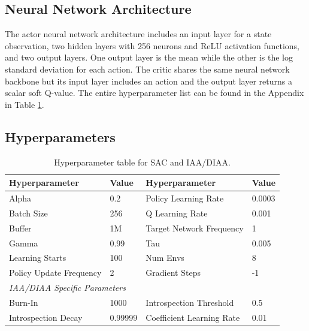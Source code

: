 \documentclass{article} %
\begin{document}
\subsection{Neural Network Architecture}
\label{appx:nn}

The actor neural network architecture includes an input layer for a state observation, two hidden layers with 256 neurons and ReLU activation functions, and two output layers. One output layer is the mean while the other is the log standard deviation for each action. The critic shares the same neural network backbone but its input layer includes an action and the output layer returns a scalar soft Q-value. The entire hyperparameter list can be found in the Appendix in Table \ref{tbl:hyperparams}.


\subsection{Hyperparameters}

\begin{table}[h]
\centering
\begin{tabular}{|l|l||l|l|}
\hline
\textbf{Hyperparameter} & \textbf{Value} & \textbf{Hyperparameter} & \textbf{Value} \\ \hline
Alpha                      & 0.2      & Policy Learning Rate      & 0.0003 \\
Batch Size                 & 256      & Q Learning Rate           & 0.001  \\
Buffer                     & 1M       & Target Network Frequency  & 1      \\
Gamma                      & 0.99     & Tau                       & 0.005  \\
Learning Starts            & 100      & Num Envs                  & 8      \\
Policy Update Frequency    & 2        & Gradient Steps            & -1     \\ \hline
\multicolumn{4}{|l|}{\textit{IAA/DIAA Specific Parameters}} \\ \hline
Burn-In                    & 1000     & Introspection Threshold   & 0.5    \\
Introspection Decay        & 0.99999  & Coefficient Learning Rate & 0.01   \\ \hline
\end{tabular}
\caption{Hyperparameter table for SAC and IAA/DIAA.}
\label{tbl:hyperparams}
\end{table}
\end{document}
